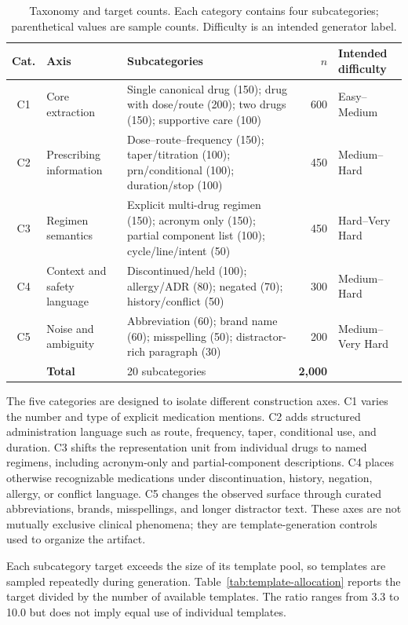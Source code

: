 \documentclass[conference]{IEEEtran}
\begin{document}
\begin{table}[t]
\caption{Taxonomy and target counts. Each category contains four
subcategories; parenthetical values are sample counts. Difficulty is an
intended generator label.}
\label{tab:taxonomy}
\centering
\footnotesize
\begin{tabularx}{\textwidth}{@{}c l Y r l@{}}
\toprule
\textbf{Cat.} & \textbf{Axis} & \textbf{Subcategories} & \textbf{$n$} & \textbf{Intended difficulty} \\
\midrule
C1 & Core extraction & Single canonical drug (150); drug with dose/route (200); two drugs (150); supportive care (100) & 600 & Easy--Medium \\
C2 & Prescribing information & Dose--route--frequency (150); taper/titration (100); prn/conditional (100); duration/stop (100) & 450 & Medium--Hard \\
C3 & Regimen semantics & Explicit multi-drug regimen (150); acronym only (150); partial component list (100); cycle/line/intent (50) & 450 & Hard--Very Hard \\
C4 & Context and safety language & Discontinued/held (100); allergy/ADR (80); negated (70); history/conflict (50) & 300 & Medium--Hard \\
C5 & Noise and ambiguity & Abbreviation (60); brand name (60); misspelling (50); distractor-rich paragraph (30) & 200 & Medium--Very Hard \\
\midrule
 & \textbf{Total} & 20 subcategories & \textbf{2,000} & \\
\bottomrule
\end{tabularx}
\end{table}

The five categories are designed to isolate different construction axes. C1
varies the number and type of explicit medication mentions. C2 adds structured
administration language such as route, frequency, taper, conditional use, and
duration. C3 shifts the representation unit from individual drugs to named
regimens, including acronym-only and partial-component descriptions. C4 places
otherwise recognizable medications under discontinuation, history, negation,
allergy, or conflict language. C5 changes the observed surface through curated
abbreviations, brands, misspellings, and longer distractor text. These axes are
not mutually exclusive clinical phenomena; they are template-generation
controls used to organize the artifact.

Each subcategory target exceeds the size of its template pool, so templates are
sampled repeatedly during generation. Table~\ref{tab:template-allocation}
reports the target divided by the number of available templates. The ratio
ranges from 3.3 to 10.0 but does not imply equal use of individual templates.
\end{document}
